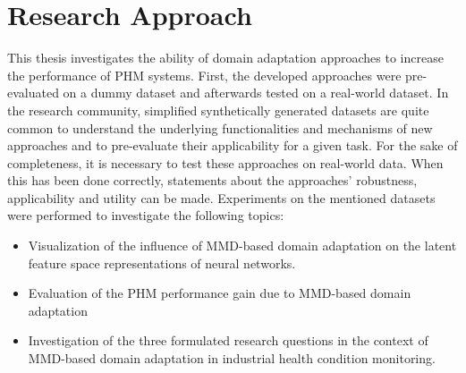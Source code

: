 \section{Research Approach}
This thesis investigates the ability of domain adaptation approaches to increase the performance of PHM systems. First, the developed approaches were pre-evaluated on a dummy dataset and afterwards tested on a real-world dataset. In the research community, simplified synthetically generated datasets are quite common to understand the underlying functionalities and mechanisms of new approaches and to pre-evaluate their applicability for a given task. For the sake of completeness, it is necessary to test these approaches on real-world data. When this has been done correctly, statements about the approaches' robustness, applicability and utility can be made. Experiments on the mentioned datasets were performed to investigate the following topics:
\begin{itemize}
    \item Visualization of the influence of MMD-based domain adaptation on the latent feature space representations of neural networks.
    \item Evaluation of the PHM performance gain due to MMD-based domain adaptation
    \item Investigation of the three formulated research questions in the context of MMD-based domain adaptation in industrial health condition monitoring.
\end{itemize}

